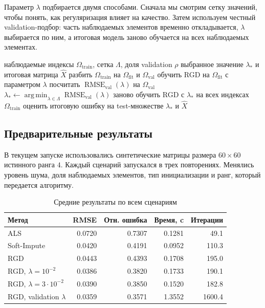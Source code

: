 \documentclass[a4paper,12pt]{article}
\newcommand{\argmin}{\operatorname*{arg\,min}}
\begin{document}
Параметр $\lambda$ подбирается двумя способами. Сначала мы смотрим сетку значений, чтобы понять, как регуляризация влияет на качество. Затем используем честный validation-подбор: часть наблюдаемых элементов временно откладывается, $\lambda$ выбирается по ним, а итоговая модель заново обучается на всех наблюдаемых элементах.

\begin{algorithm}[H]
\caption{Validation-подбор параметра $\lambda$}
\label{alg:validation-lambda-final}
\begin{algorithmic}[1]
\Require наблюдаемые индексы $\Omega_{\mathrm{train}}$, сетка $\Lambda$, доля validation $\rho$
\Ensure выбранное значение $\lambda_*$ и итоговая матрица $\widehat X$
\State разбить $\Omega_{\mathrm{train}}$ на $\Omega_{\mathrm{fit}}$ и $\Omega_{\mathrm{val}}$
\For{$\lambda\in\Lambda$}
    \State обучить RGD на $\Omega_{\mathrm{fit}}$ с параметром $\lambda$
    \State посчитать $\operatorname{RMSE}_{\mathrm{val}}(\lambda)$ на $\Omega_{\mathrm{val}}$
\EndFor
\State $\lambda_*\gets \argmin_{\lambda\in\Lambda}\operatorname{RMSE}_{\mathrm{val}}(\lambda)$
\State заново обучить RGD с $\lambda_*$ на всех индексах $\Omega_{\mathrm{train}}$
\State оценить итоговую ошибку на test-множестве
\State \Return $\lambda_*$ и $\widehat X$
\end{algorithmic}
\end{algorithm}

\subsection{Предварительные результаты}

В текущем запуске использовались синтетические матрицы размера $60\times 60$ истинного ранга $4$. Каждый сценарий запускался в трех повторениях. Менялись уровень шума, доля наблюдаемых элементов, тип инициализации и ранг, который передается алгоритму.

\begin{table}[H]
\centering
\small
\caption{Средние результаты по всем сценариям}
\label{tab:main-results-final}
\begin{tabular}{lrrrr}
\toprule
Метод & RMSE & Отн. ошибка & Время, c & Итерации \\
\midrule
ALS & 0.0720 & 0.7307 & 0.1281 & 49.1 \\
Soft-Impute & 0.0420 & 0.4191 & 0.0952 & 110.3 \\
RGD & 0.0443 & 0.4393 & 0.1708 & 195.0 \\
RGD, $\lambda=10^{-2}$ & 0.0386 & 0.3820 & 0.1733 & 190.1 \\
RGD, $\lambda=3\cdot10^{-2}$ & 0.0390 & 0.3850 & 0.1520 & 182.8 \\
RGD, validation $\lambda$ & 0.0359 & 0.3571 & 1.3552 & 1600.4 \\
\bottomrule
\end{tabular}
\end{table}
\end{document}
